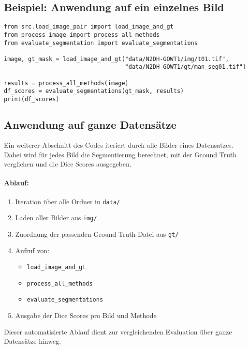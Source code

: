\documentclass[a4paper,12pt]{article}
\begin{document}
\subsection*{ Beispiel: Anwendung auf ein einzelnes Bild}

\begin{verbatim}
from src.load_image_pair import load_image_and_gt
from process_image import process_all_methods
from evaluate_segmentation import evaluate_segmentations

image, gt_mask = load_image_and_gt("data/N2DH-GOWT1/img/t01.tif",
                                   "data/N2DH-GOWT1/gt/man_seg01.tif")

results = process_all_methods(image)
df_scores = evaluate_segmentations(gt_mask, results)
print(df_scores)
\end{verbatim}

\subsection*{ Anwendung auf ganze Datensätze}

Ein weiterer Abschnitt des Codes iteriert durch alle Bilder eines Datensatzes. Dabei wird für jedes Bild die Segmentierung berechnet, mit der Ground Truth verglichen und die Dice Scores ausgegeben.

\paragraph{Ablauf:}
\begin{enumerate}
  \item Iteration über alle Ordner in \texttt{data/}
  \item Laden aller Bilder aus \texttt{img/}
  \item Zuordnung der passenden Ground-Truth-Datei aus \texttt{gt/}
  \item Aufruf von:
    \begin{itemize}
      \item \texttt{load\_image\_and\_gt}
      \item \texttt{process\_all\_methods}
      \item \texttt{evaluate\_segmentations}
    \end{itemize}
  \item Ausgabe der Dice Scores pro Bild und Methode
\end{enumerate}

Dieser automatisierte Ablauf dient zur vergleichenden Evaluation über ganze Datensätze hinweg.
\end{document}

